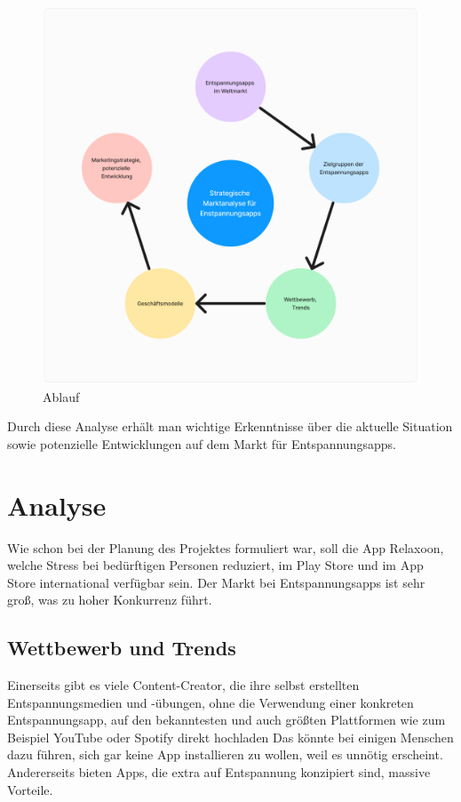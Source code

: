 \begin{figure}[H]
    \centering
    \includegraphics[height=\textwidth]{./pics/Marktanalyse-Relaxoon.png}
    \caption{Ablauf}
\end{figure}

Durch diese Analyse erhält man wichtige Erkenntnisse über die aktuelle Situation sowie potenzielle Entwicklungen
auf dem Markt für Entspannungsapps.


\section{Analyse}

Wie schon bei der Planung des Projektes formuliert war, soll die App Relaxoon, welche Stress bei bedürftigen 
Personen reduziert, im Play Store und im App Store 
international verfügbar sein. Der Markt bei Entspannungsapps
ist sehr groß, was zu hoher Konkurrenz führt. 

\subsection{Wettbewerb und Trends}

Einerseits gibt es viele Content-Creator, die ihre selbst erstellten Entspannungsmedien und -übungen, 
ohne die Verwendung einer konkreten 
Entspannungsapp, auf den bekanntesten und
auch größten Plattformen wie zum Beispiel YouTube oder Spotify direkt hochladen
Das könnte bei einigen Menschen dazu führen, sich gar keine App installieren zu wollen, weil es unnötig erscheint.
Andererseits bieten Apps, die extra auf Entspannung konzipiert sind, massive Vorteile. 

